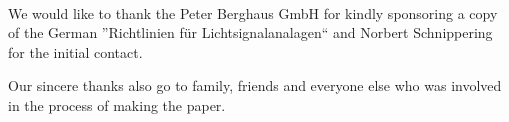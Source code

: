 \vspace{3cm}
\begingroup
{}\\
\endgroup
\vspace{1.5cm}

We would like to thank the Peter Berghaus GmbH for kindly sponsoring a copy of the German ''Richtlinien für Lichtsignalanalagen`` and Norbert Schnippering for the initial contact.

Our sincere thanks also go to family, friends and everyone else who was involved in the process of making the paper.